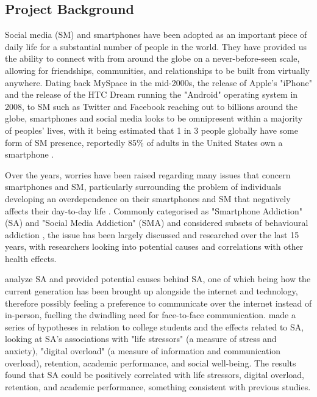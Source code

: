 \documentclass[12pt]{article}
\begin{document}
\subsection{Project Background}
Social media (SM) and smartphones 
have been adopted as an important piece of daily life for a substantial number of people in the world. 
They have provided us the ability to connect with from around the globe on a 
never-before-seen scale, allowing for friendships, communities, and relationships to be built from virtually 
anywhere. Dating back MySpace in the mid-2000s, the release of Apple's "iPhone" and the
release of the HTC Dream running the "Android" operating system in 2008, to SM such as Twitter and Facebook 
reaching out to billions around the globe, smartphones and social 
media looks to be omnipresent within a majority of peoples' lives, with it being estimated that 1 in 3 people 
globally have some form of SM presence, reportedly 85\% of 
adults in the United States own a smartphone .\newline

Over the years, worries have been raised regarding many issues that concern smartphones and 
SM, particularly surrounding the problem of individuals developing an overdependence on their smartphones 
and SM that negatively affects their day-to-day life 
.
Commonly categorised as "Smartphone Addiction" (SA) and "Social Media Addiction" (SMA) and considered 
subsets of behavioural addiction 
, the issue has been largely discussed 
and researched over the last 15 years, with researchers looking into potential causes and 
correlations with other health effects.\newline

 analyze SA and provided potential causes 
behind SA, one of which being how the current generation has been brought up alongside the internet 
and technology, therefore possibly feeling a preference to communicate over the internet instead of 
in-person, fuelling the dwindling need for face-to-face communication. 
made a series of hypotheses in relation to college students and the effects 
related to SA, looking at SA's associations with "life stressors" (a measure of stress and anxiety), "digital overload" 
(a measure of information and communication overload), retention, academic performance, and social well-being. The results 
found that SA could be positively correlated with life stressors, digital overload, retention, and academic performance, 
something consistent with previous studies.\newline
\end{document}
